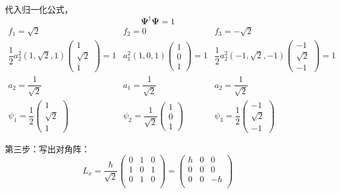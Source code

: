 \begin{frame} 
    代入归一化公式， $$ \pmb {\Psi} ^{\dagger } \pmb {\Psi} =1 $$
    $$\begin{matrix}
    f_1=\sqrt{2} & f_2=0  &  f_3=-\sqrt{2}\\
    \dfrac{1}{2} a_2 ^2 (1, \sqrt{2}, 1)
    \begin{pmatrix}
    1\\
    {\sqrt{2}}\\
    1
    \end{pmatrix} 
    =1 
    & 
    a_1 ^2 (1, 0, 1)
    \begin{pmatrix}
     1\\
     0\\
     1
    \end{pmatrix} 
    =1 
     &
     \dfrac{1}{2} a_2 ^2 (-1, \sqrt{2}, -1)
    \begin{pmatrix}
     -1\\
     {\sqrt{2}}\\
     -1
    \end{pmatrix} 
    =1 \\
    a_2= \dfrac{1}{\sqrt{2}} &  a_1= \dfrac{1}{\sqrt{2}} &   a_2=\dfrac{1}{\sqrt{2}} 
    \\
    \psi_1=\dfrac{1}{2}
    \begin{pmatrix}
    1\\
    \sqrt{2}\\
    1
    \end{pmatrix}  
    & 
    \psi_2=\dfrac{1}{\sqrt{2}}
    \begin{pmatrix}
    1\\
    0\\
    1
    \end{pmatrix}  
    &
    \psi_3=\dfrac{1}{2}
    \begin{pmatrix}
    -1\\
    \sqrt{2}\\
    -1
    \end{pmatrix}  
    \end{matrix}$$   
\end{frame}

\begin{frame} 
    第三步：写出对角阵：
    $$ L_x= \frac{\hbar}{\sqrt{2}}
        \begin{pmatrix}
            0 & 1 & 0  \\
            1 & 0 & 1  \\
            0 & 1 & 0 \\
         \end{pmatrix} 
    = 
    \begin{pmatrix}
        \hbar & 0 & 0  \\
        0 & 0 &   0\\
        0 & 0 & -\hbar \\
     \end{pmatrix} 
    $$
\end{frame}

